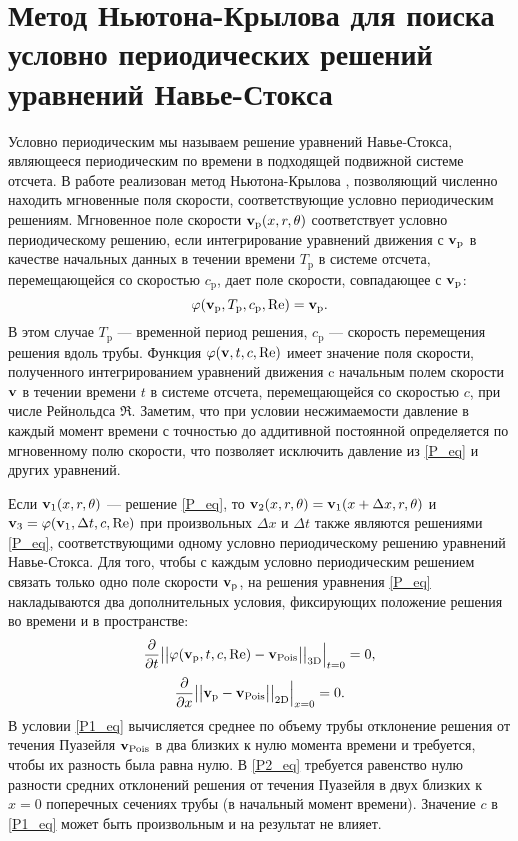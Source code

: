 \section{Метод Ньютона-Крылова для поиска условно периодических решений уравнений Навье-Стокса} \label{Newton_seq}

Условно периодическим мы называем решение уравнений Навье-Стокса, являющееся периодическим по времени в подходящей подвижной системе отсчета. В работе реализован метод Ньютона-Крылова \cite{Sanchez2004, Viswanath2007, Dijkstra2014}, позволяющий численно находить мгновенные поля скорости, соответствующие условно периодическим решениям. Мгновенное поле скорости  $\mathbf{v}_\mathrm{p}(x,r,\theta)$ соответствует условно периодическому решению, если интегрирование уравнений движения с $\mathbf{v}_\mathrm{p}$ в качестве начальных данных в течении времени $T_\mathrm{p}$ в системе отсчета, перемещающейся со скоростью $c_\mathrm{p}$, дает поле скорости, совпадающее с $\mathbf{v}_\mathrm{p}$:
\begin{equation}\label{P_eq}
\varphi(\mathbf{v}_\mathrm{p}, T_\mathrm{p}, c_\mathrm{p}, \operatorname{Re}) = \mathbf{v}_\mathrm{p}.
\end{equation}
В этом случае $T_\mathrm{p}$  --- временной период решения, $c_\mathrm{p}$ --- скорость перемещения решения вдоль трубы. Функция $\varphi(\mathbf{v}, t, c, \operatorname{Re})$ имеет значение поля скорости, полученного интегрированием уравнений движения c начальным полем скорости $\mathbf{v}$ в течении времени $t$ в системе отсчета, перемещающейся со скоростью $c$, при числе Рейнольдса $\Re$. Заметим, что при условии несжимаемости давление в каждый момент времени с точностью до аддитивной постоянной определяется по мгновенному полю скорости, что позволяет исключить давление из \eqref{P_eq} и других уравнений. 

Если $\mathbf{v}_1(x,r,\theta)$ --- решение \eqref{P_eq}, то $\mathbf{v}_2(x, r, \theta) = \mathbf{v}_1(x + \Delta x, r, \theta)$ и $\mathbf{v}_3 = \varphi(\mathbf{v}_1, \Delta t, c, \operatorname{Re})$ при произвольных $\Delta x$ и $\Delta t$ также являются решениями \eqref{P_eq}, соответствующими одному условно периодическому решению уравнений Навье-Стокса. Для того, чтобы с каждым условно периодическим решением связать только одно поле скорости $\mathbf{v}_\mathrm{p}$, на решения уравнения \eqref{P_eq} накладываются два дополнительных условия, фиксирующих положение решения во времени и в пространстве:
\begin{equation} \label{P1_eq}
\frac{\partial }{\partial t} \big|\big| \varphi(\mathbf{v}_\mathrm{p}, t, c, \operatorname{Re}) - \mathbf{v}_\mathrm{Pois} \big|\big|_\mathrm{3D} \Big|_{t=0} = 0,
\end{equation}
\begin{equation} \label{P2_eq}
\frac{\partial }{\partial x} \big|\big| \mathbf{v}_\mathrm{p} - \mathbf{v}_\mathrm{Pois} \big|\big|_\mathrm{2D} \Big|_{x = 0} = 0. 
\end{equation}
В условии \eqref{P1_eq} вычисляется среднее по объему трубы отклонение решения от течения Пуазейля $\mathbf{v}_{\mathrm{Pois}}$ в два близких к нулю момента времени и требуется, чтобы их разность была равна нулю. В \eqref{P2_eq} требуется равенство нулю разности средних отклонений решения от течения Пуазейля в двух близких к $x=0$ поперечных сечениях трубы (в начальный момент времени). Значение $c$ в \eqref{P1_eq} может быть произвольным и на результат не влияет. 


